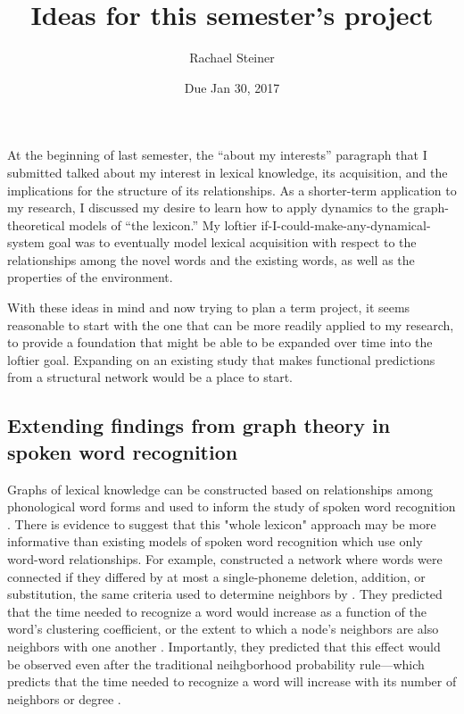\documentclass{article}
\title{Ideas for this semester's project}
\date{Due Jan 30, 2017}
\author{Rachael Steiner}
\begin{document}
\maketitle

At the beginning of last semester, the ``about my interests'' paragraph
that I submitted talked about my interest in lexical knowledge, its
acquisition, and the implications for the structure of its
relationships. As a shorter-term application to my research, I discussed
my desire to learn how to apply dynamics to the graph-theoretical models
of ``the lexicon.'' My loftier if-I-could-make-any-dynamical-system goal
was to eventually model lexical acquisition with respect to the
relationships among the novel words and the existing words, as well as
the properties of the environment.

With these ideas in mind and now trying to plan a term project, it seems reasonable
to start with the one that can be more readily applied to my research, to provide
a foundation that might be able to be expanded over time into the loftier goal.
Expanding on an existing study that makes functional predictions from a structural
network would be a place to start.

\subsection{Extending findings from graph theory in spoken word
recognition}\label{extending-findings-from-graph-theory-in-spoken-word-recognition}

Graphs of lexical knowledge can be constructed based on relationships among
phonological word forms and used to inform the study of spoken word recognition
\citep{vit08}. There is evidence to suggest that this "whole lexicon" approach
may be more informative than existing models of spoken word recognition which
use only word-word relationships. For example, \citet{ChVit09} constructed a
network where words were connected if they differed by at most a single-phoneme
deletion, addition, or substitution, the same criteria used to determine neighbors
by \citet{lp98}. They predicted that the time needed to recognize a word would
increase as a function of the word's clustering coefficient, or the extent to
which a node's neighbors are also neighbors with one another \citep{ws}.
Importantly, they predicted that this effect would be observed even after the
traditional neihgborhood probability rule---which predicts that the time needed
to recognize a word will increase with its number of neighbors or degree \citep{lp98}.
\end{document}
